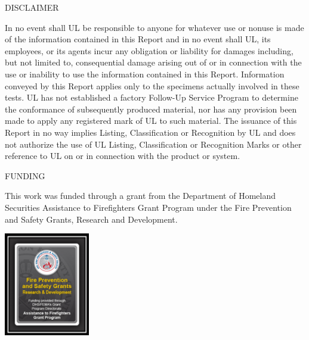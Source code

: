 \documentclass{article}
\begin{document}
\clearpage

\begin{center}
DISCLAIMER\\
\vspace*{\baselineskip}
\begin{adjustwidth}{-0.25in}{-0.25in}
In no event shall UL be responsible to anyone for whatever use or nonuse is made of the information contained in this Report and in no event shall UL, its employees, or its agents incur any obligation or liability for damages including, but not limited to, consequential damage arising out of or in connection  with the use or inability to use the information contained in this Report. Information conveyed by this Report applies only to the specimens actually involved in these tests. UL has not established a factory Follow-Up Service Program to determine the conformance of subsequently produced material, nor has any provision been made to apply any registered mark of UL to such material. The issuance of this Report in no way implies Listing, Classification or Recognition by UL and does not authorize the use of UL Listing, Classification or Recognition Marks or other reference to UL on or in connection with the product or system.
\end{adjustwidth}
\end{center}

\begin{center}
FUNDING
\end{center}

\vspace*{\baselineskip}

This work was funded through a grant from the Department of Homeland Securities Assistance to Firefighters Grant Program under the Fire Prevention and Safety Grants, Research and Development.  

\begin{center}
	\includegraphics[width=0.28\textwidth]{0_Images/DHS.png}
\end{center}

\clearpage
\end{document}
